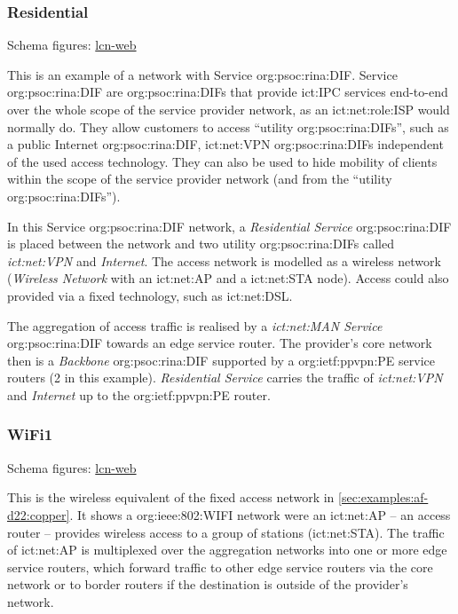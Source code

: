 \subsubsection{Residential}
\label{sec:examples:af-d22:residential}
Schema figures: \href{https://vdmeer.github.io/skb/ipc/lcn-examples/arcfire/af-d22-residential/index.html}{lcn-web}

This is an example of a network with Service \acs{org:psoc:rina:DIF}.
Service \acs{org:psoc:rina:DIF} are \acp{org:psoc:rina:DIF} that provide \acs{ict:IPC} services end-to-end over the whole scope of the service provider network, as an \acs{ict:net:role:ISP} would normally do.
They allow customers to access ``utility \acp{org:psoc:rina:DIF}'', such as a public Internet \ac{org:psoc:rina:DIF}, \ac{ict:net:VPN} \acp{org:psoc:rina:DIF} independent of the used access technology.
They can also be used to hide mobility of clients within the scope of the service provider network (and from the ``utility \acp{org:psoc:rina:DIF}'').

In this Service \acs{org:psoc:rina:DIF} network, a \textit{Residential Service} \ac{org:psoc:rina:DIF} is placed between the network and two utility \acp{org:psoc:rina:DIF} called \textit{\acs{ict:net:VPN}} and \textit{Internet}.
The access network is modelled as a wireless network (\textit{Wireless Network} with an \ac{ict:net:AP} and a \ac{ict:net:STA} node).
Access could also provided via a fixed technology, such as \acs{ict:net:DSL}.

The aggregation of access traffic is realised by a \textit{\acs{ict:net:MAN} Service} \ac{org:psoc:rina:DIF} towards an edge service router.
The provider's core network then is a \textit{Backbone} \ac{org:psoc:rina:DIF} supported by a \ac{org:ietf:ppvpn:PE} service routers (2 in this example).
\textit{Residential Service} carries the traffic of \textit{\acs{ict:net:VPN}} and \textit{Internet} up to the \ac{org:ietf:ppvpn:PE} router.




\subsubsection{WiFi1}
\label{sec:examples:af-d22:wifi1}
Schema figures: \href{https://vdmeer.github.io/skb/ipc/lcn-examples/arcfire/af-d22-wifi1/index.html}{lcn-web}

This is the wireless equivalent of the fixed access network in \autoref{sec:examples:af-d22:copper}.
It shows a \acs{org:ieee:802:WIFI} network were an \ac{ict:net:AP} -- an access router -- provides wireless access to a group of stations (\acs{ict:net:STA}).
The traffic of \ac{ict:net:AP} is multiplexed over the aggregation networks into one or more edge service routers, which forward traffic to other edge service routers via the core network or to border routers if the destination is outside of the provider's network.

